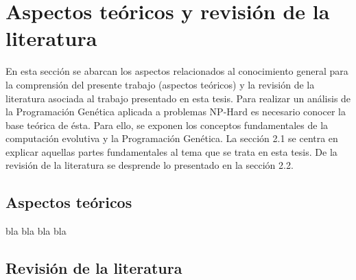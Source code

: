 \chapter{Aspectos teóricos y revisión de la literatura}

En esta sección se abarcan los aspectos relacionados al conocimiento general para la comprensión del presente trabajo (aspectos teóricos) y la revisión de la literatura asociada al trabajo presentado en esta tesis. Para realizar un análisis de la Programación Genética aplicada a problemas NP-Hard es necesario conocer la base teórica de ésta. Para ello, se exponen los conceptos fundamentales de la computación evolutiva y la Programación Genética. La sección 2.1 se centra en explicar aquellas partes fundamentales al tema que se trata en esta tesis. De la revisión de la literatura se desprende lo presentado en la sección 2.2.

\section{Aspectos teóricos}
bla bla bla bla
\section{Revisión de la literatura}
